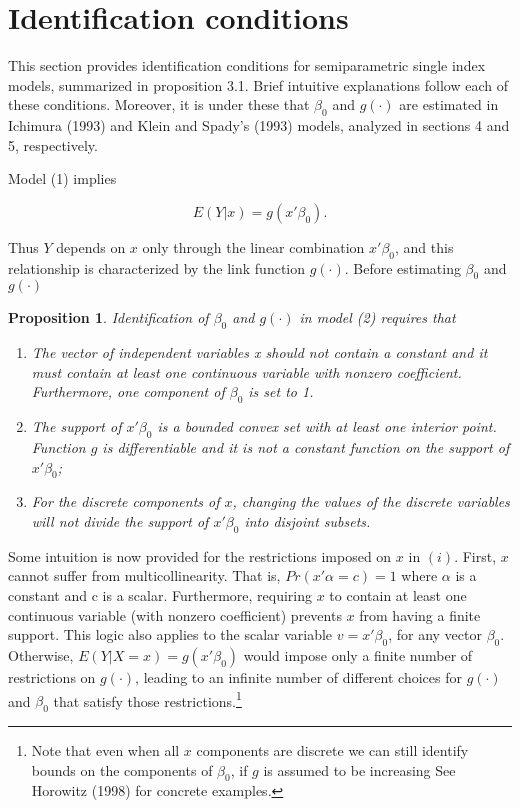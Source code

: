 \documentclass[a4paper]{article}
\begin{document}
\section{Identification conditions} %
\label{sec:Identification conditions}

This section provides identification conditions for semiparametric single index models,  summarized in proposition 3.1. Brief intuitive explanations follow each of these conditions. Moreover, it is under these that $\beta_0$ and $ g(\cdot)$ are estimated in Ichimura (1993) and Klein and Spady's (1993) models, analyzed in sections 4 and 5, respectively.


Model (1) implies

\begin{equation}
E(Y|x) = g(x'\beta_0).
\end{equation}

Thus $Y$ depends on $x$ only through the linear combination $x'\beta_0$, and this relationship is characterized by the link function $g(\cdot)$. Before estimating  $\beta_0$ and $ g(\cdot)$



\newtheorem{prop}{Proposition}[section]

\begin{prop}
Identification of $\beta_0$ and $g(\cdot)$ in model (2) requires that
\begin{enumerate}[label=(\roman*)]
\item The vector of independent variables x should not contain a constant and it must contain at least one continuous variable with nonzero coefficient. Furthermore, one component of $\beta_0$ is set to 1. 
\item The support of $x'\beta_0$ is a bounded convex set with at least one interior point. Function $g$ is differentiable and it is not a constant function on the support of $x'\beta_0$;
\item For the discrete components of $x$, changing the values of the discrete variables will not divide the support of $x'\beta_0$ into disjoint subsets.
\end{enumerate}
\end{prop}

Some intuition is now provided for the restrictions imposed on $x$ in $(i)$. First, $x$ cannot suffer from multicollinearity. That is, $Pr(x'\alpha = c) = 1$ where $\alpha$ is a constant and c is a scalar. Furthermore, requiring $x$ to contain at least one continuous variable (with nonzero coefficient) prevents $x$ from having a finite support. This logic also applies to  the scalar variable $ v = x'\beta_0 $, for any vector $\beta_0$. Otherwise, $E(Y|X = x) = g(x'\beta_0)$ would impose only a finite number of restrictions on $g(\cdot)$, leading to an infinite number of different choices for $g(\cdot)$ and $\beta_0$ that satisfy those restrictions.\footnote{Note that even when all $x$ components are discrete we can still identify bounds on the components of $\beta_0$, if $g$ is assumed to be increasing See Horowitz (1998) for  concrete examples.} 
\end{document}
